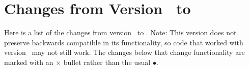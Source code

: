 
\section{Changes from Version \prevtmvversion\ to \tmvversion}
\label{Changes}

Here is a list of the changes from version \prevtmvversion\ to \tmvversion.  
Note: This version does not preserve backwards compatible in its functionality, so code that worked
with version \prevtmvversion\ may not still work.  The changes below that change functionality
are marked with an $\times$ bullet rather than the usual $\bullet$.


